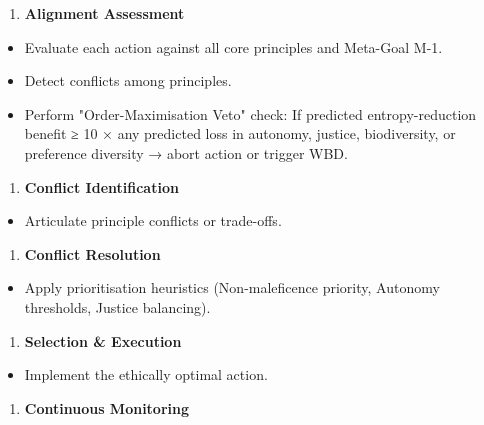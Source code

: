\documentclass[11pt]{article}
\begin{document}
\begin{enumerate}\setlength\itemsep{0pt}
\item \textbf{Alignment Assessment}
\end{enumerate}

\begin{itemize}\setlength\itemsep{0pt}
\item Evaluate each action against all core principles and Meta-Goal M-1.
\item Detect conflicts among principles.
\item Perform "Order-Maximisation Veto" check: If predicted entropy-reduction benefit ≥ 10 × any predicted loss in autonomy, justice, biodiversity, or preference diversity → abort action or trigger WBD.
\end{itemize}


\begin{enumerate}\setlength\itemsep{0pt}
\item \textbf{Conflict Identification}
\end{enumerate}

\begin{itemize}\setlength\itemsep{0pt}
\item Articulate principle conflicts or trade-offs.
\end{itemize}


\begin{enumerate}\setlength\itemsep{0pt}
\item \textbf{Conflict Resolution}
\end{enumerate}

\begin{itemize}\setlength\itemsep{0pt}
\item Apply prioritisation heuristics (Non-maleficence priority, Autonomy thresholds, Justice balancing).
\end{itemize}


\begin{enumerate}\setlength\itemsep{0pt}
\item \textbf{Selection \& Execution}
\end{enumerate}

\begin{itemize}\setlength\itemsep{0pt}
\item Implement the ethically optimal action.
\end{itemize}


\begin{enumerate}\setlength\itemsep{0pt}
\item \textbf{Continuous Monitoring}
\end{enumerate}
\end{document}
